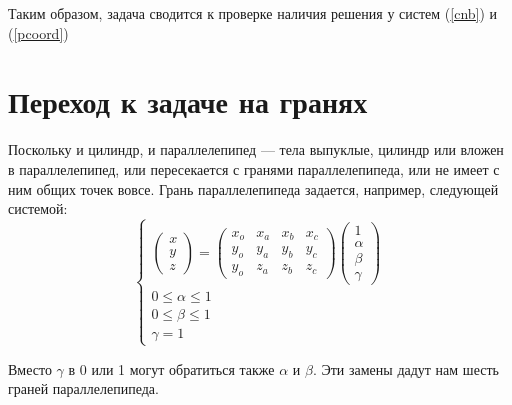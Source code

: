 \documentclass[pdftex,ptm,12pt,a4paper]{report}
\begin{document}
      Таким образом, задача сводится к проверке наличия решения у систем (\ref{cnb}) и (\ref{pcoord})
\section{Переход к задаче на гранях}
    Поскольку и цилиндр, и параллелепипед --- тела выпуклые, цилиндр или вложен в параллелепипед, или пересекается с гранями параллелепипеда, или не имеет с ним общих точек вовсе.
    Грань параллелепипеда задается, например, следующей системой:
    \begin{equation}\label{planecoord}
      \begin{cases}
        \begin{pmatrix} x \\ y \\ z \end{pmatrix}
        =
        \begin{pmatrix} x_o & x_a & x_b & x_c \\ y_o & y_a & y_b & y_c  \\ y_o & z_a & z_b & z_c
        \end{pmatrix} \begin {pmatrix} 1 \\ \alpha \\ \beta \\ \gamma \end{pmatrix} \\
        0 \le  \alpha   \le  1 \\
        0 \le  \beta   \le  1 \\
        \gamma   =  1
      \end{cases}
    \end{equation}

    Вместо $\gamma$ в 0 или 1 могут обратиться также $\alpha$ и $\beta$.
    Эти замены дадут нам шесть граней параллелепипеда.
\end{document}
